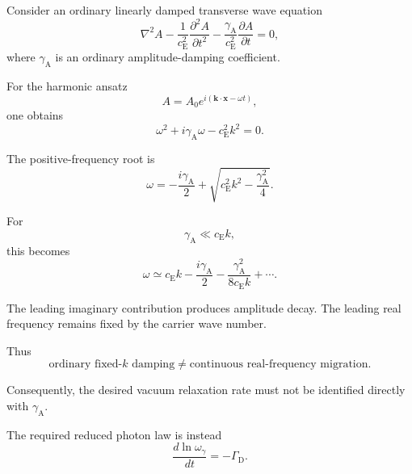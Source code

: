 Consider an ordinary linearly damped transverse wave equation
\begin{equation}
    \nabla^2 A
    -
    \frac{1}{c_{\mathrm E}^2}
    \frac{\partial^2 A}{\partial t^2}
    -
    \frac{\gamma_{\mathrm A}}{c_{\mathrm E}^2}
    \frac{\partial A}{\partial t}
    =
    0,
    \label{eq:AQ_linear_damped_wave}
\end{equation}
where $\gamma_{\mathrm A}$ is an ordinary amplitude-damping coefficient.

For the harmonic ansatz
\begin{equation}
    A
    =
    A_0
    e^{i(\mathbf{k}\cdot\mathbf{x}-\omega t)},
\end{equation}
one obtains
\begin{equation}
    \omega^2
    +
    i\gamma_{\mathrm A}\omega
    -
    c_{\mathrm E}^2k^2
    =
    0.
\end{equation}

The positive-frequency root is
\begin{equation}
    \omega
    =
    -\frac{i\gamma_{\mathrm A}}{2}
    +
    \sqrt{
        c_{\mathrm E}^2k^2
        -
        \frac{\gamma_{\mathrm A}^2}{4}
    }.
\end{equation}

For
\begin{equation}
    \gamma_{\mathrm A}
    \ll
    c_{\mathrm E}k,
\end{equation}
this becomes
\begin{equation}
    \omega
    \simeq
    c_{\mathrm E}k
    -
    \frac{i\gamma_{\mathrm A}}{2}
    -
    \frac{\gamma_{\mathrm A}^2}
    {8c_{\mathrm E}k}
    +\cdots.
\end{equation}

The leading imaginary contribution produces amplitude decay. The leading real
frequency remains fixed by the carrier wave number.

Thus
\begin{equation}
    \boxed{
    \text{ordinary fixed-}k\text{ damping}
    \neq
    \text{continuous real-frequency migration}.
    }
    \label{eq:AQ_damping_nogo}
\end{equation}

Consequently, the desired vacuum relaxation rate must not be identified
directly with $\gamma_{\mathrm A}$.

The required reduced photon law is instead
\begin{equation}
    \boxed{
    \frac{d\ln\omega_{\gamma}}{dt}
    =
    -\Gamma_{\mathrm D}.
    }
    \label{eq:AQ_required_frequency_law}
\end{equation}


